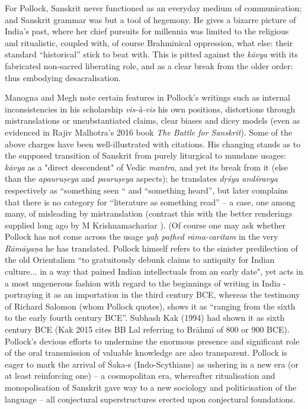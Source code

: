 For Pollock, Sanskrit never functioned as an everyday medium of communication; and Sanskrit grammar was but a tool of hegemony. He gives a bizarre picture of India’s past, where her chief pursuits for millennia was limited to the religious and ritualistic, coupled with, of course Brahminical oppression, what else: their standard “historical” stick to beat with. This is pitted against the \textit{kāvya} with its fabricated non-sacred liberating role, and as a clear break from the older order: thus embodying desacralisation.

Manogna and Megh note certain features in Pollock’s writings such as internal inconsistencies in his scholarship \textit{vis-à-vis} his own positions, distortions through mistranslations or unsubstantiated claims, clear biases and dicey models (even as evidenced in Rajiv Malhotra’s 2016 book \textit{The Battle for Sanskrit}). Some of the above charges have been well-illustrated with citations. His changing stands as to the supposed transition of Sanskrit from purely liturgical to mundane usages: \textit{kāvya} as a "direct descendent" of Vedic \textit{mantra}, and yet its break from it (else than the \textit{apauruṣeya} and \textit{pauruṣeya} aspects); he translates \textit{dṛśya andśravya} respectively as “something seen “ and “something heard”, but later complains that there is no category for “literature as something read” – a case, one among many, of misleading by mistranslation (contrast this with the better renderings supplied long ago by M Krishnamachariar ). (Of course one may ask whether Pollock has not come across the usage \textit{yaḥ paṭhed rāma-caritam} in the very \textit{Rāmāyaṇa} he has translated. Pollock himself refers to the sinister predilection of the old Orientalism “to gratuitously debunk claims to antiquity for Indian culture... in a way that pained Indian intellectuals from an early date", yet acts in a most ungenerous fashion with regard to the beginnings of writing in India - portraying it as an importation in the third century BCE, whereas the testimony of Richard Salomon (whom Pollock quotes), shows it as “ranging from the sixth to the early fourth century BCE”. Subhash Kak (1994) had shown it as sixth century BCE (Kak 2015 cites BB Lal referring to Brāhmī of 800 or 900 BCE). Pollock’s devious efforts to undermine the enormous presence and significant role of the oral transmission of valuable knowledge are also transparent. Pollock is eager to mark the arrival of Śaka-s (Indo-Scythians) as ushering in a new era (or at least reinforcing one) – a cosmopolitan era, whereafter ritualisation and monopolisation of Sanskrit gave way to a new sociology and politicisation of the language – all conjectural superstructures erected upon conjectural foundations.


